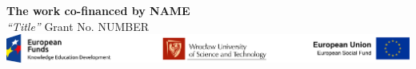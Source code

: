 \thispagestyle{empty}
\vspace*{\fill}
\noindent
\begin{center}
\textbf{The work co-financed by NAME} \\[1ex]
\textit{
``Title''
} 
Grant No. NUMBER \\[1ex] 

\includegraphics[width=\linewidth]{figs/banner_Interdok.pdf}
\end{center}